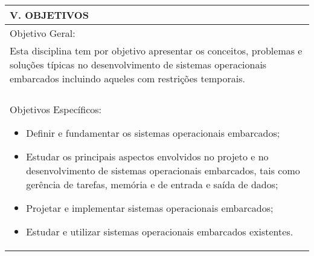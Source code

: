 \documentclass[12pt]{article}
\begin{document}
\begin{longtable}{|L{1.025\textwidth}|} \hline
%
{\bf V. OBJETIVOS } \\ \hline

Objetivo Geral: 
\\
Esta disciplina tem por objetivo apresentar os conceitos, problemas e soluções típicas no desenvolvimento de sistemas operacionais embarcados incluindo aqueles com restrições temporais. \\
\\
Objetivos Específicos:

\begin{itemize}
\item Definir e fundamentar os sistemas operacionais embarcados;
\item Estudar os principais aspectos envolvidos no projeto e no desenvolvimento de sistemas operacionais embarcados, tais como gerência de tarefas, memória e de entrada e saída de dados;
\item Projetar e implementar sistemas operacionais embarcados;
\item Estudar e utilizar sistemas operacionais embarcados existentes.
\end{itemize}
\\ \hline
\end{longtable}
\end{document}
